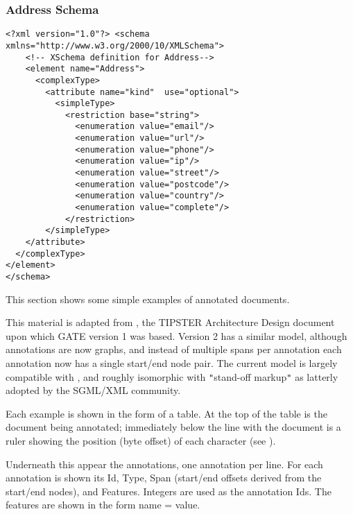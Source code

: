 \subsubsection*{Address Schema}
\begin{small}
\begin{verbatim}
<?xml version="1.0"?> <schema
xmlns="http://www.w3.org/2000/10/XMLSchema">
    <!-- XSchema definition for Address-->
    <element name="Address">
      <complexType>
        <attribute name="kind"  use="optional">
          <simpleType>
            <restriction base="string">
              <enumeration value="email"/>
              <enumeration value="url"/>
              <enumeration value="phone"/>
              <enumeration value="ip"/>
              <enumeration value="street"/>
              <enumeration value="postcode"/>
              <enumeration value="country"/>
              <enumeration value="complete"/>
            </restriction>
        </simpleType>
    </attribute>
  </complexType>
</element>
</schema>
\end{verbatim}
\end{small}
\nnormalsize



This section shows some simple examples of annotated documents.

This material is adapted from \cite{Gri96b}, the TIPSTER Architecture Design
document upon which GATE version 1 was based. Version 2 has a similar model,
although annotations are now graphs, and instead of multiple spans per
annotation each annotation now has a single start/end node pair. The current
model is largely compatible with \cite{Bir99}, and roughly isomorphic with
{\tt{}"{}}stand-off markup{\tt{}"{}} as latterly adopted by the SGML/XML
community.

Each example is shown in the form of a table. At the top of the table is the
document being annotated; immediately below the line with the document is a
ruler showing the position (byte offset) of each character 
(see ).

Underneath this appear the annotations, one annotation per line. 
For each annotation is shown its Id, Type, Span (start/end offsets derived 
from the start/end nodes), and Features. Integers are used as the annotation 
Ids.  The features are shown in the form name = value.

